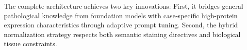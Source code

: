 \documentclass[journal,twoside,web]{ieeecolor}
\begin{document}
The complete architecture achieves two key innovations: {First, it bridges general pathological knowledge from foundation models with case-specific high-protein expression characteristics through adaptive prompt tuning. } Second, the hybrid normalization strategy respects both semantic staining directives and biological tissue constraints. 

\end{document}
